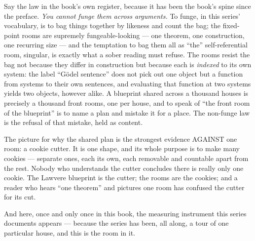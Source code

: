 Say the law in the book's own register, because it has been the book's
spine since the preface. \emph{You cannot funge them across arguments.}
To funge, in this series' vocabulary, is to bag things together by
likeness and count the bag; the fixed-point rooms are supremely
fungeable-looking --- one theorem, one construction, one recurring size
--- and the temptation to bag them all as ``the'' self-referential room,
singular, is exactly what a sober reading must refuse. The rooms resist
the bag not because they differ in construction but because each is
\emph{indexed} to its own system: the label ``G\"odel sentence'' does not
pick out one object but a function from systems to their own sentences,
and evaluating that function at two systems yields two objects, however
alike. A blueprint shared across a thousand houses is precisely a
thousand front rooms, one per house, and to speak of ``the front room of
the blueprint'' is to name a plan and mistake it for a place. The
non-funge law is the refusal of that mistake, held as content.

\begin{intuition}
The picture for why the shared plan is the strongest evidence AGAINST one
room: a cookie cutter. It is one shape, and its whole purpose is to make
many cookies --- separate ones, each its own, each removable and countable
apart from the rest. Nobody who understands the cutter concludes there is
really only one cookie. The Lawvere blueprint is the cutter; the rooms are
the cookies; and a reader who hears ``one theorem'' and pictures one room
has confused the cutter for its cut.
\end{intuition}

And here, once and only once in this book, the measuring instrument this
series documents appears --- because the series has been, all along, a
tour of one particular house, and this is the room in it.

